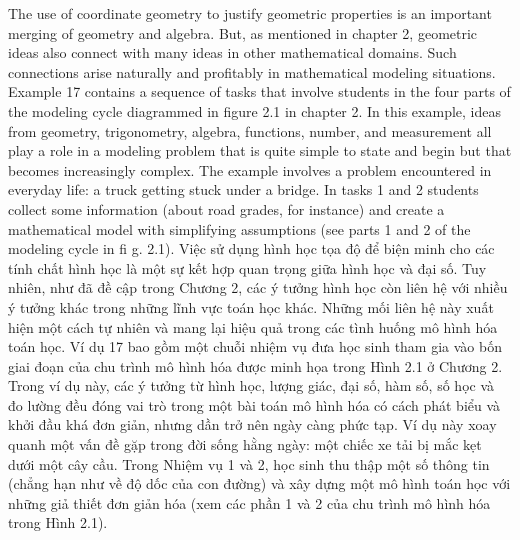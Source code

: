 \documentclass[
  10pt,
  a4paper,
  landscape,
  twoside,
  openany
]{scrbook}
\newcommand{\EN}[1]{#1}
\newcommand{\VI}[1]{#1}
\newcommand{\NOTE}[1]{#1}
\newcounter{example}
\begin{document}
\TriPara
{
\EN{The use of coordinate geometry to justify geometric properties is an important merging of geometry and algebra. But, as mentioned in chapter 2, geometric ideas also connect with many ideas in other mathematical domains. Such connections arise naturally and profitably in mathematical modeling situations. Example 17 contains a sequence of tasks that involve students in the four parts of the modeling cycle diagrammed in figure 2.1 in chapter 2. In this example, ideas from geometry, trigonometry, algebra, functions, number, and measurement all play a role in a modeling problem that is quite simple to state and begin but that becomes increasingly complex. The example involves a problem encountered in everyday life: a truck getting stuck under a bridge. In tasks 1 and 2 students collect some information (about road grades, for instance) and create a mathematical model with simplifying assumptions (see parts 1 and 2 of the modeling cycle in fi g. 2.1).}
}
{
\VI{Việc sử dụng hình học tọa độ để biện minh cho các tính chất hình học là một sự kết hợp quan trọng giữa hình học và đại số. Tuy nhiên, như đã đề cập trong Chương 2, các ý tưởng hình học còn liên hệ với nhiều ý tưởng khác trong những lĩnh vực toán học khác. Những mối liên hệ này xuất hiện một cách tự nhiên và mang lại hiệu quả trong các tình huống mô hình hóa toán học. Ví dụ 17 bao gồm một chuỗi nhiệm vụ đưa học sinh tham gia vào bốn giai đoạn của chu trình mô hình hóa được minh họa trong Hình 2.1 ở Chương 2. Trong ví dụ này, các ý tưởng từ hình học, lượng giác, đại số, hàm số, số học và đo lường đều đóng vai trò trong một bài toán mô hình hóa có cách phát biểu và khởi đầu khá đơn giản, nhưng dần trở nên ngày càng phức tạp. Ví dụ này xoay quanh một vấn đề gặp trong đời sống hằng ngày: một chiếc xe tải bị mắc kẹt dưới một cây cầu. Trong Nhiệm vụ 1 và 2, học sinh thu thập một số thông tin (chẳng hạn như về độ dốc của con đường) và xây dựng một mô hình toán học với những giả thiết đơn giản hóa (xem các phần 1 và 2 của chu trình mô hình hóa trong Hình 2.1).}
}
{
\NOTE{}
}
\end{document}
